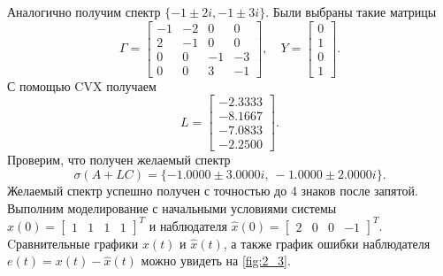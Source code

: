 Аналогично получим спектр $\{-1 \pm 2i, -1 \pm 3i\}$.
Были выбраны такие матрицы
\begin{equation*}
    \Gamma=\begin{bmatrix}
        -1&  -2&  0&  0\\
        2& -1&  0&  0\\
        0&  0& -1&  -3\\
        0&  0&  3& -1
    \end{bmatrix},\quad
    Y=\begin{bmatrix}
        0\\ 1\\ 0\\ 1
    \end{bmatrix}.
\end{equation*} 
С помощью CVX получаем
\begin{equation*}
    L=\begin{bmatrix}
        -2.3333\\
        -8.1667\\
        -7.0833\\
        -2.2500
    \end{bmatrix}.
\end{equation*}
Проверим, что получен желаемый спектр
\begin{equation*}
    \sigma(A+LC)=\{
        -1.0000 \pm 3.0000i,\ 
        -1.0000 \pm 2.0000i
        \}.
\end{equation*}
Желаемый спектр успешно получен с точностью до 4 знаков после запятой.
Выполним моделирование с начальными условиями системы 
$x(0) = \begin{bmatrix}
    1 & 1 & 1 & 1
\end{bmatrix}^T$ и наблюдателя $\hat x(0) = \begin{bmatrix}
    2 & 0 & 0 & -1
\end{bmatrix}^T$. Cравнительные графики $x(t)$ и $\hat x(t)$, 
а также график ошибки наблюдателя $e(t) = x(t) -\hat x(t)$
можно увидеть на \autoref{fig:2_3}.


